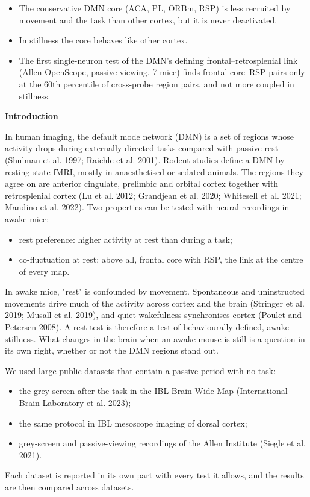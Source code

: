 \documentclass[10pt,a4paper]{article}
\begin{document}
\begin{itemize}
\item The conservative DMN core (ACA, PL, ORBm, RSP) is less recruited by movement and the task than other cortex, but it is never deactivated.
\item In stillness the core behaves like other cortex.
\item The first single-neuron test of the DMN's defining frontal--retrosplenial link (Allen OpenScope, passive viewing, 7 mice) finds frontal core--RSP pairs only at the 60th percentile of cross-probe region pairs, and not more coupled in stillness.
\end{itemize}
\bigskip
{\LARGE\bfseries Introduction}\par\smallskip{\color{accent}\rule{\linewidth}{0.8pt}}\par\medskip
In human imaging, the default mode network (DMN) is a set of regions whose activity drops during externally directed tasks compared with passive rest (Shulman et al. 1997; Raichle et al. 2001). Rodent studies define a DMN by resting-state fMRI, mostly in anaesthetised or sedated animals. The regions they agree on are anterior cingulate, prelimbic and orbital cortex together with retrosplenial cortex (Lu et al. 2012; Grandjean et al. 2020; Whitesell et al. 2021; Mandino et al. 2022). Two properties can be tested with neural recordings in awake mice:

\begin{itemize}
\item rest preference: higher activity at rest than during a task;
\item co-fluctuation at rest: above all, frontal core with RSP, the link at the centre of every map.
\end{itemize}
In awake mice, "rest" is confounded by movement. Spontaneous and uninstructed movements drive much of the activity across cortex and the brain (Stringer et al. 2019; Musall et al. 2019), and quiet wakefulness synchronises cortex (Poulet and Petersen 2008). A rest test is therefore a test of behaviourally defined, awake stillness. What changes in the brain when an awake mouse is still is a question in its own right, whether or not the DMN regions stand out.

We used large public datasets that contain a passive period with no task:

\begin{itemize}
\item the grey screen after the task in the IBL Brain-Wide Map (International Brain Laboratory et al. 2023);
\item the same protocol in IBL mesoscope imaging of dorsal cortex;
\item grey-screen and passive-viewing recordings of the Allen Institute (Siegle et al. 2021).
\end{itemize}
Each dataset is reported in its own part with every test it allows, and the results are then compared across datasets.
\end{document}
